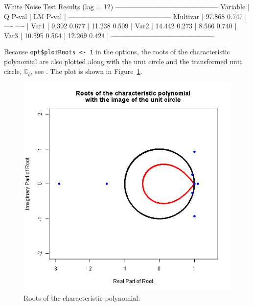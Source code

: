 \documentclass[article]{jss}
\begin{document}
\begin{CodeChunk} 
\begin{CodeOutput}
       White Noise Test Results (lag = 12)
---------------------------------------------
Variable |       Q  P-val |      LM  P-val  |
---------------------------------------------
Multivar |  97.868  0.747 |     ----  ----  |
Var1     |   9.302  0.677 |  11.238  0.509  |
Var2     |  14.442  0.273 |   8.566  0.740  |
Var3     |  10.595  0.564 |  12.269  0.424  |
---------------------------------------------
\end{CodeOutput}
\end{CodeChunk} 

Because \verb|opt$plotRoots <- 1| in the options, 
the roots of the characteristic polynomial are also plotted along with the unit circle and the transformed unit circle, $\mathbb{C}_{\hat{b}}$, see \cite{Johansen2008}. 
The plot is shown in Figure~\ref{fig:Roots}.


%



\begin{figure}[H]
  \centering
  \includegraphics[scale = .6, keepaspectratio=true]{Figures/roots.png}
  \caption{Roots of the characteristic polynomial.}
  \label{fig:Roots}
\end{figure}
\end{document}
